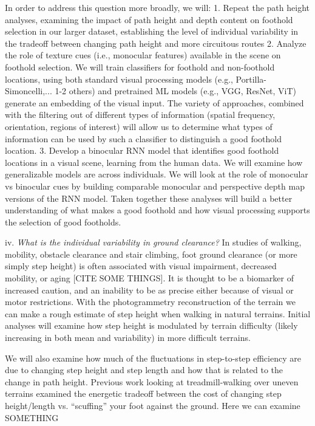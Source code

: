 \documentclass[
]{article}
\begin{document}
In order to address this question more broadly, we will: 1. Repeat the
path height analyses, examining the impact of path height and depth
content on foothold selection in our larger dataset, establishing the
level of individual variability in the tradeoff between changing path
height and more circuitous routes 2. Analyze the role of texture cues
(i.e., monocular features) available in the scene on foothold selection.
We will train classifiers for foothold and non-foothold locations, using
both standard visual processing models (e.g., Portilla-Simoncelli,...
1-2 others) and pretrained ML models (e.g., VGG, ResNet, ViT) generate
an embedding of the visual input. The variety of approaches, combined
with the filtering out of different types of information (spatial
frequency, orientation, regions of interest) will allow us to determine
what types of information can be used by such a classifier to
distinguish a good foothold location. 3. Develop a binocular RNN model
that identifies good foothold locations in a visual scene, learning from
the human data. We will examine how generalizable models are across
individuals. We will look at the role of monocular vs binocular cues by
building comparable monocular and perspective depth map versions of the
RNN model. Taken together these analyses will build a better
understanding of what makes a good foothold and how visual processing
supports the selection of good footholds.

iv. \emph{What is the individual variability in ground clearance?} In
studies of walking, mobility, obstacle clearance and stair climbing,
foot ground clearance (or more simply step height) is often associated
with visual impairment, decreased mobility, or aging {[}CITE SOME
THINGS{]}. It is thought to be a biomarker of increased caution, and an
inability to be as precise either because of visual or motor
restrictions. With the photogrammetry reconstruction of the terrain we
can make a rough estimate of step height when walking in natural
terrains. Initial analyses will examine how step height is modulated by
terrain difficulty (likely increasing in both mean and variability) in
more difficult terrains.

We will also examine how much of the fluctuations in step-to-step
efficiency are due to changing step height and step length and how that
is related to the change in path height. Previous work looking at
treadmill-walking over uneven terrains examined the energetic tradeoff
between the cost of changing step height/length vs. ``scuffing'' your
foot against the ground. Here we can examine SOMETHING
\end{document}
